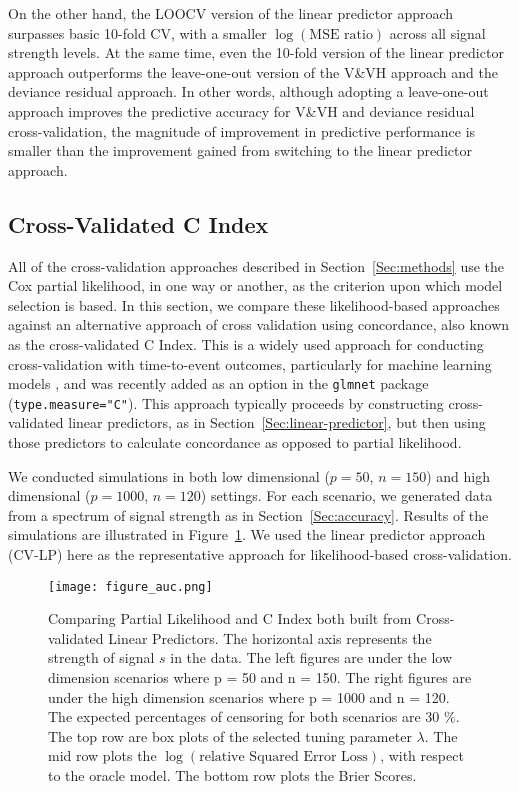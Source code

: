 On the other hand, the LOOCV version of the linear predictor approach surpasses basic 10-fold CV, with a smaller $\log(\text{MSE ratio})$ across all signal strength levels. At the same time, even the 10-fold version of the linear predictor approach outperforms the leave-one-out version of the V\&VH approach and the deviance residual approach. In other words, although adopting a leave-one-out approach improves the predictive accuracy for V\&VH and deviance residual cross-validation, the magnitude of improvement in predictive performance is smaller than the improvement gained from switching to the linear predictor approach.

\subsection {Cross-Validated C Index}
\label{Sec:CIndex}

\par All of the cross-validation approaches described in Section~\ref{Sec:methods} use the Cox partial likelihood, in one way or another, as the criterion upon which model selection is based.  In this section, we compare these likelihood-based approaches against an alternative approach of cross validation using concordance, also known as the cross-validated C Index.  This is a widely used approach for conducting cross-validation with time-to-event outcomes, particularly for machine learning models \citep{Subramanian2011,Simon2011a}, and was recently added as an option in the \texttt{glmnet} package (\texttt{type.measure="C"}). This approach typically proceeds by constructing cross-validated linear predictors, as in Section~\ref{Sec:linear-predictor}, but then using those predictors to calculate concordance as opposed to partial likelihood.

\par We conducted simulations in both low dimensional ($p = 50$, $n = 150$) and high dimensional ($p = 1000$, $n = 120$) settings. For each scenario, we generated data from a spectrum of signal strength as in Section~\ref{Sec:accuracy}. Results of the simulations are illustrated in Figure~\ref{Fig:cvauc}.  We used the linear predictor approach (CV-LP) here as the representative approach for likelihood-based cross-validation.

\begin{figure}[!htb]
  \centering
  \texttt{[image: figure\_auc.png]}
  \caption{\label{Fig:cvauc}Comparing Partial Likelihood and C Index both built from Cross-validated Linear Predictors. The horizontal axis represents the strength of signal $s$ in the data. The left figures are under the low dimension scenarios where p = 50 and n = 150. The right figures are under the high dimension scenarios where p = 1000 and n = 120. The expected percentages of censoring for both scenarios are 30 $\%$. The top row are box plots of the selected tuning parameter $\lambda$. The mid row plots the $\log(\text{relative Squared Error Loss})$, with respect to the oracle model. The bottom row plots the Brier Scores. }
\end{figure}

